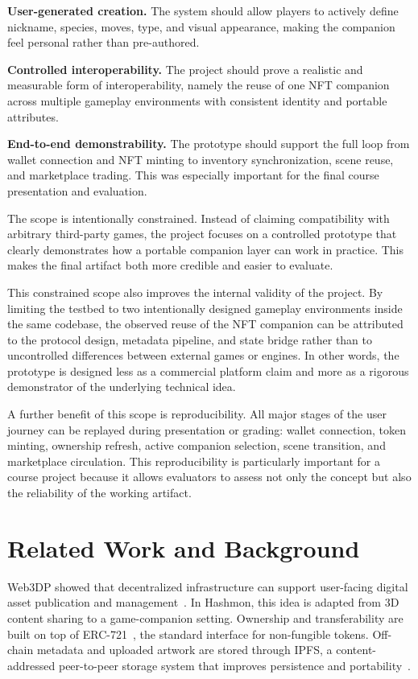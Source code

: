 \documentclass[sigconf]{acmart}
\begin{document}
\textbf{User-generated creation.} The system should allow players to actively define nickname, species, moves, type, and visual appearance, making the companion feel personal rather than pre-authored.

\textbf{Controlled interoperability.} The project should prove a realistic and measurable form of interoperability, namely the reuse of one NFT companion across multiple gameplay environments with consistent identity and portable attributes.

\textbf{End-to-end demonstrability.} The prototype should support the full loop from wallet connection and NFT minting to inventory synchronization, scene reuse, and marketplace trading. This was especially important for the final course presentation and evaluation.

The scope is intentionally constrained. Instead of claiming compatibility with arbitrary third-party games, the project focuses on a controlled prototype that clearly demonstrates how a portable companion layer can work in practice. This makes the final artifact both more credible and easier to evaluate.

This constrained scope also improves the internal validity of the project. By limiting the testbed to two intentionally designed gameplay environments inside the same codebase, the observed reuse of the NFT companion can be attributed to the protocol design, metadata pipeline, and state bridge rather than to uncontrolled differences between external games or engines. In other words, the prototype is designed less as a commercial platform claim and more as a rigorous demonstrator of the underlying technical idea.

A further benefit of this scope is reproducibility. All major stages of the user journey can be replayed during presentation or grading: wallet connection, token minting, ownership refresh, active companion selection, scene transition, and marketplace circulation. This reproducibility is particularly important for a course project because it allows evaluators to assess not only the concept but also the reliability of the working artifact.

\section{Related Work and Background}
Web3DP showed that decentralized infrastructure can support user-facing digital asset publication and management~\cite{web3dp}. In Hashmon, this idea is adapted from 3D content sharing to a game-companion setting. Ownership and transferability are built on top of ERC-721~\cite{erc721}, the standard interface for non-fungible tokens. Off-chain metadata and uploaded artwork are stored through IPFS, a content-addressed peer-to-peer storage system that improves persistence and portability~\cite{benet2014ipfs}.
\end{document}
